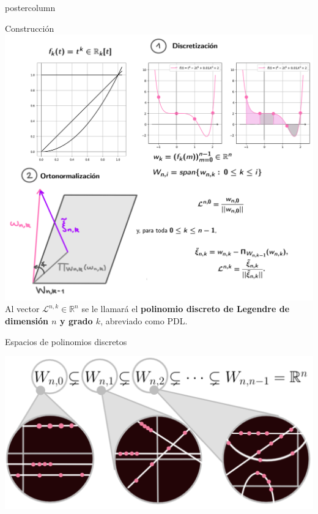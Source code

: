 \documentclass[final,hyperref={pdfpagelabels=false}]{beamer}
\newcommand{\IR}{\mathbb{R}}
\newcommand{\cali}[1]{\mathcal{#1}} %
\begin{document}
\begin{frame}
\begin{columns}
\begin{column}{.49\textwidth}
\begin{beamercolorbox}[center,wd=\textwidth]{postercolumn}
			\begin{block}{Construcci\'on}
			\includegraphics[width=0.95\linewidth]{esquema_construccion_bien}	
			Al vector $\cali{L}^{n,k} \in \IR^{n}$ se le llamar\'a el
			\textbf{polinomio discreto de Legendre de dimensi\'on $n$
			y grado $k$}, abreviado como PDL.
			\end{block}			                        
            \vfill
		    \vspace{1cm}
            
            
			\begin{block}{Espacios de polinomios discretos}
			\begin{center}
			\includegraphics[width=0.7\linewidth]{nuevas_lupas}
			\end{center}
		

\end{block}
\end{beamercolorbox}
\end{column}
\end{columns}
\end{frame}
\end{document}
